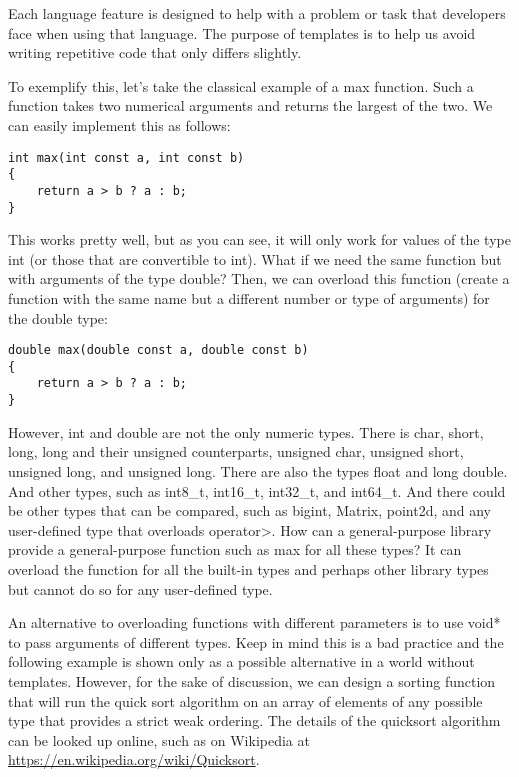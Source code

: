 Each language feature is designed to help with a problem or task that developers face when using that language. The purpose of templates is to help us avoid writing repetitive code that only differs slightly.

To exemplify this, let's take the classical example of a max function. Such a function takes two numerical arguments and returns the largest of the two. We can easily implement this as follows:

\begin{lstlisting}[style=styleCXX]
int max(int const a, int const b)
{
	return a > b ? a : b;
}
\end{lstlisting}

This works pretty well, but as you can see, it will only work for values of the type int (or those that are convertible to int). What if we need the same function but with arguments of the type double? Then, we can overload this function (create a function with the same name but a different number or type of arguments) for the double type:

\begin{lstlisting}[style=styleCXX]
double max(double const a, double const b)
{
	return a > b ? a : b;
}
\end{lstlisting}

However, int and double are not the only numeric types. There is char, short, long, long and their unsigned counterparts, unsigned char, unsigned short, unsigned long, and unsigned long. There are also the types float and long double. And other types, such as int8\_t, int16\_t, int32\_t, and int64\_t. And there could be other types that can be compared, such as bigint, Matrix, point2d, and any user-defined type that overloads operator>. How can a general-purpose library provide a general-purpose function such as max for all these types? It can overload the function for all the built-in types and perhaps other library types but cannot do so for any user-defined type.

An alternative to overloading functions with different parameters is to use void* to pass arguments of different types. Keep in mind this is a bad practice and the following example is shown only as a possible alternative in a world without templates. However, for the sake of discussion, we can design a sorting function that will run the quick sort algorithm on an array of elements of any possible type that provides a strict weak ordering. The details of the quicksort algorithm can be looked up online, such as on Wikipedia at \url{https://en.wikipedia.org/wiki/Quicksort}.

